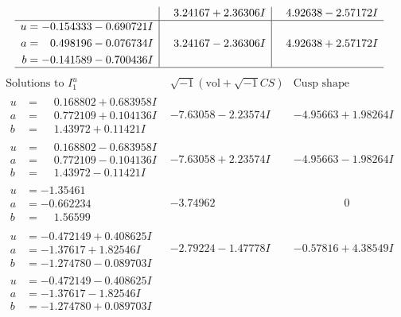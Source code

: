 \documentclass[1p]{elsarticle_modified}
\theoremstyle{definition}
\newcommand{\I}{\sqrt{-1}}
\begin{document}
$$\begin{array}{c|c|c}
 & \phantom{-}3.24167 + 2.36306 I & \phantom{-}4.92638 - 2.57172 I \\ \hline\begin{aligned}
u &= -0.154333 - 0.690721 I \\
a &= \phantom{-}0.498196 - 0.076734 I \\
b &= -0.141589 - 0.700436 I\end{aligned}
 & \phantom{-}3.24167 - 2.36306 I & \phantom{-}4.92638 + 2.57172 I\\
 \hline 
 \end{array}$$\newpage$$\begin{array}{c|c|c}  
\text{Solutions to }I^u_{1}& \I (\text{vol} + \sqrt{-1}CS) & \text{Cusp shape}\\
 \hline 
\begin{aligned}
u &= \phantom{-}0.168802 + 0.683958 I \\
a &= \phantom{-}0.772109 + 0.104136 I \\
b &= \phantom{-}1.43972 + 0.11421 I\end{aligned}
 & -7.63058 - 2.23574 I & -4.95663 + 1.98264 I \\ \hline\begin{aligned}
u &= \phantom{-}0.168802 - 0.683958 I \\
a &= \phantom{-}0.772109 - 0.104136 I \\
b &= \phantom{-}1.43972 - 0.11421 I\end{aligned}
 & -7.63058 + 2.23574 I & -4.95663 - 1.98264 I \\ \hline\begin{aligned}
u &= -1.35461\phantom{ +0.000000I} \\
a &= -0.662234\phantom{ +0.000000I} \\
b &= \phantom{-}1.56599\phantom{ +0.000000I}\end{aligned}
 & -3.74962\phantom{ +0.000000I} & \phantom{-0.000000 } 0 \\ \hline\begin{aligned}
u &= -0.472149 + 0.408625 I \\
a &= -1.37617 + 1.82546 I \\
b &= -1.274780 - 0.089703 I\end{aligned}
 & -2.79224 - 1.47778 I & -0.57816 + 4.38549 I \\ \hline\begin{aligned}
u &= -0.472149 - 0.408625 I \\
a &= -1.37617 - 1.82546 I \\
b &= -1.274780 + 0.089703 I\end{aligned}

\end{array}$$
\end{document}

